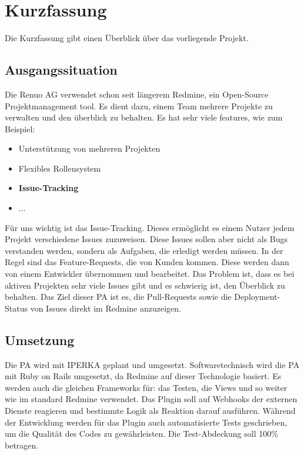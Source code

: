 \chapter{Kurzfassung}

Die Kurzfassung gibt einen Überblick über das vorliegende Projekt.

\section{Ausgangssituation}

Die Renuo AG verwendet schon seit längerem Redmine, ein \gls{Open-Source} Projektmanagement tool. Es dient dazu, einem
Team mehrere Projekte zu verwalten und den überblick zu behalten. Es hat sehr viele features, wie zum Beispiel: \cite{redmine_homepage}
\begin{itemize}
    \item Unterstützung von mehreren Projekten
    \item Flexibles Rollensystem
    \item \textbf{Issue-Tracking}
    \item ...
\end{itemize}
Für uns wichtig ist das Issue-Tracking. Dieses ermöglicht es einem Nutzer jedem Projekt verschiedene Issues zuzuweisen.
Diese Issues sollen aber nicht als Bugs verstanden werden, sondern als Aufgaben, die erledigt werden müssen. In der Regel sind das
\gls{Feature-Requests}, die von Kunden kommen. Diese werden dann von einem Entwickler übernommen und bearbeitet. \newline
Das Problem ist, dass es bei aktiven Projekten sehr viele Issues gibt und es schwierig ist, den Überblick zu behalten.
Das Ziel dieser PA ist es, die \gls{Pull-Request}s sowie die \gls{Deployment}-Status von Issues direkt im Redmine anzuzeigen.

\section{Umsetzung}

Die PA wird mit IPERKA geplant und umgesetzt. \newline
Softwaretechnisch wird die PA mit Ruby on Rails umgesetzt, da Redmine auf dieser Technologie basiert. Es werden auch
die gleichen Frameworks für: das Testen, die Views und so weiter wie im standard Redmine verwendet. \newline
Das Plugin soll auf Webhooks der externen Dienste reagieren und bestimmte Logik als Reaktion darauf ausführen. \newline
Während der Entwicklung werden für das Plugin auch automatisierte Tests geschrieben, um die Qualität des Codes zu gewährleisten.
Die Test-Abdeckung soll 100\% betragen.


